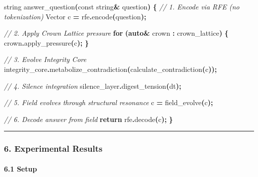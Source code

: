 \documentclass[
  11pt,
  a4paper,
]{article}
\newenvironment{Shaded}{\begin{snugshade}}{\end{snugshade}}
\newcommand{\AttributeTok}[1]{\textcolor[rgb]{0.13,0.29,0.53}{#1}}
\newcommand{\CommentTok}[1]{\textcolor[rgb]{0.56,0.35,0.01}{\textit{#1}}}
\newcommand{\ControlFlowTok}[1]{\textcolor[rgb]{0.13,0.29,0.53}{\textbf{#1}}}
\newcommand{\KeywordTok}[1]{\textcolor[rgb]{0.13,0.29,0.53}{\textbf{#1}}}
\newcommand{\NormalTok}[1]{#1}
\newcommand{\OperatorTok}[1]{\textcolor[rgb]{0.81,0.36,0.00}{\textbf{#1}}}
\begin{document}
\begin{Shaded}
\begin{Highlighting}[]
\NormalTok{string answer\_question}\OperatorTok{(}\AttributeTok{const}\NormalTok{ string}\OperatorTok{\&}\NormalTok{ question}\OperatorTok{)} \OperatorTok{\{}
    \CommentTok{// 1. Encode via RFE (no tokenization)}
\NormalTok{    Vector c }\OperatorTok{=}\NormalTok{ rfe}\OperatorTok{.}\NormalTok{encode}\OperatorTok{(}\NormalTok{question}\OperatorTok{);}
    
    \CommentTok{// 2. Apply Crown Lattice pressure}
    \ControlFlowTok{for} \OperatorTok{(}\KeywordTok{auto}\OperatorTok{\&}\NormalTok{ crown }\OperatorTok{:}\NormalTok{ crown\_lattice}\OperatorTok{)} \OperatorTok{\{}
\NormalTok{        crown}\OperatorTok{.}\NormalTok{apply\_pressure}\OperatorTok{(}\NormalTok{c}\OperatorTok{);}
    \OperatorTok{\}}
    
    \CommentTok{// 3. Evolve Integrity Core}
\NormalTok{    integrity\_core}\OperatorTok{.}\NormalTok{metabolize\_contradiction}\OperatorTok{(}\NormalTok{calculate\_contradiction}\OperatorTok{(}\NormalTok{c}\OperatorTok{));}
    
    \CommentTok{// 4. Silence integration}
\NormalTok{    silence\_layer}\OperatorTok{.}\NormalTok{digest\_tension}\OperatorTok{(}\NormalTok{dt}\OperatorTok{);}
    
    \CommentTok{// 5. Field evolves through structural resonance}
\NormalTok{    c }\OperatorTok{=}\NormalTok{ field\_evolve}\OperatorTok{(}\NormalTok{c}\OperatorTok{);}
    
    \CommentTok{// 6. Decode answer from field}
    \ControlFlowTok{return}\NormalTok{ rfe}\OperatorTok{.}\NormalTok{decode}\OperatorTok{(}\NormalTok{c}\OperatorTok{);}
\OperatorTok{\}}
\end{Highlighting}
\end{Shaded}

\begin{center}\rule{0.5\linewidth}{0.5pt}\end{center}

\subsubsection{6. Experimental Results}\label{experimental-results}

\paragraph{6.1 Setup}\label{setup}
\end{document}
